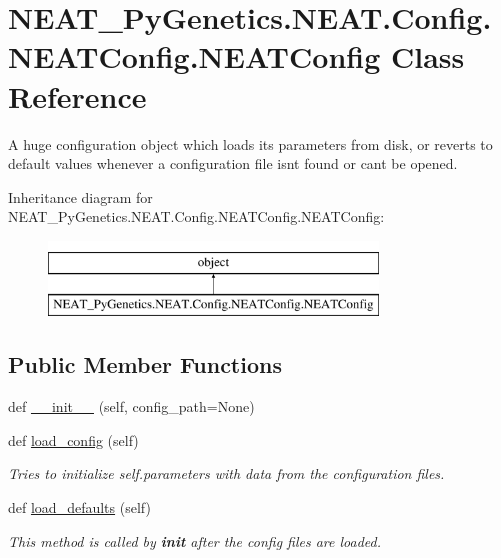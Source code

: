 \hypertarget{classNEAT__PyGenetics_1_1NEAT_1_1Config_1_1NEATConfig_1_1NEATConfig}{}\section{N\+E\+A\+T\+\_\+\+Py\+Genetics.\+N\+E\+A\+T.\+Config.\+N\+E\+A\+T\+Config.\+N\+E\+A\+T\+Config Class Reference}
\label{classNEAT__PyGenetics_1_1NEAT_1_1Config_1_1NEATConfig_1_1NEATConfig}


A huge configuration object which loads it\textquotesingle{}s parameters from disk, or reverts to default values whenever a configuration file isn\textquotesingle{}t found or can\textquotesingle{}t be opened.  


Inheritance diagram for N\+E\+A\+T\+\_\+\+Py\+Genetics.\+N\+E\+A\+T.\+Config.\+N\+E\+A\+T\+Config.\+N\+E\+A\+T\+Config\+:\begin{figure}[H]
\begin{center}
\leavevmode
\includegraphics[height=2.000000cm]{classNEAT__PyGenetics_1_1NEAT_1_1Config_1_1NEATConfig_1_1NEATConfig}
\end{center}
\end{figure}
\subsection*{Public Member Functions}
\begin{DoxyCompactItemize}
\item 
def \hyperlink{classNEAT__PyGenetics_1_1NEAT_1_1Config_1_1NEATConfig_1_1NEATConfig_a88504e0a5c56f166a3ee5898ae3e0dea}{\+\_\+\+\_\+init\+\_\+\+\_\+} (self, config\+\_\+path=None)
\item 
def \hyperlink{classNEAT__PyGenetics_1_1NEAT_1_1Config_1_1NEATConfig_1_1NEATConfig_aa6843226e3a017a384c8244f4e62e0f5}{load\+\_\+config} (self)
\begin{DoxyCompactList}\small\item\em Tries to initialize self.\+parameters with data from the configuration files. \end{DoxyCompactList}\item 
def \hyperlink{classNEAT__PyGenetics_1_1NEAT_1_1Config_1_1NEATConfig_1_1NEATConfig_a2669153b4f4160d33477fc89d16dd716}{load\+\_\+defaults} (self)
\begin{DoxyCompactList}\small\item\em This method is called by {\bfseries init} after the config files are loaded. \end{DoxyCompactList}\end{DoxyCompactItemize}
